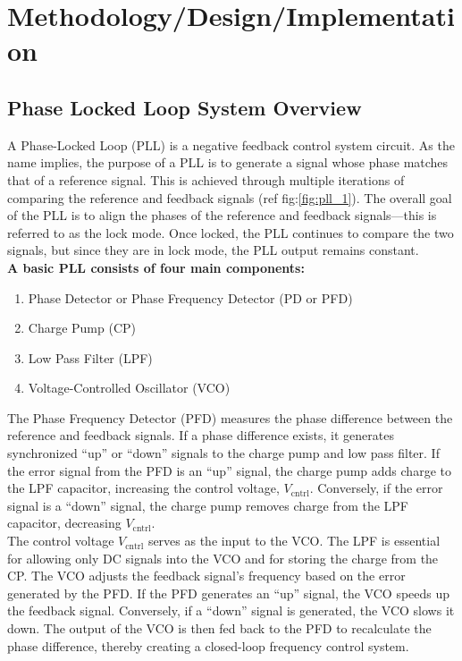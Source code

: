 \chapter{Methodology/Design/Implementation}
\label{chapter:method}
\section{Phase Locked Loop System Overview}
\label{sec:pll_overview}
A Phase-Locked Loop (PLL) is a negative feedback control system circuit. As the name implies, the purpose of a PLL is to generate a signal whose phase matches that of a reference signal. This is achieved through multiple iterations of comparing the reference and feedback signals (ref fig:\ref{fig:pll_1}). The overall goal of the PLL is to align the phases of the reference and feedback signals—this is referred to as the lock mode. Once locked, the PLL continues to compare the two signals, but since they are in lock mode, the PLL output remains constant. \\
\textbf{A basic PLL consists of four main components:}
\begin{enumerate}
	\item Phase Detector or Phase Frequency Detector (PD or PFD)
	\item Charge Pump (CP)
	\item Low Pass Filter (LPF)
	\item Voltage-Controlled Oscillator (VCO)
\end{enumerate}
The Phase Frequency Detector (PFD) measures the phase difference between the reference and feedback signals. If a phase difference exists, it generates synchronized “up” or “down” signals to the charge pump and low pass filter. If the error signal from the PFD is an “up” signal, the charge pump adds charge to the LPF capacitor, increasing the control voltage, \( V_{\text{cntrl}} \). Conversely, if the error signal is a “down” signal, the charge pump removes charge from the LPF capacitor, decreasing \( V_{\text{cntrl}} \).\\
The control voltage \( V_{\text{cntrl}} \) serves as the input to the VCO. The LPF is essential for allowing only DC signals into the VCO and for storing the charge from the CP. The VCO adjusts the feedback signal's frequency based on the error generated by the PFD. If the PFD generates an “up” signal, the VCO speeds up the feedback signal. Conversely, if a “down” signal is generated, the VCO slows it down. The output of the VCO is then fed back to the PFD to recalculate the phase difference, thereby creating a closed-loop frequency control system.

